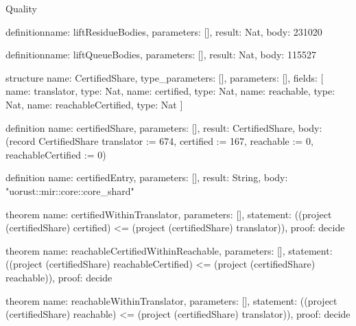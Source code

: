 \begin{lexlean}{Quality}
\begin{semanticmodule}
definition{name: liftResidueBodies, parameters: [], result: Nat, body: 231020}

definition{name: liftQueueBodies, parameters: [], result: Nat, body: 115527}

structure{
  name: CertifiedShare,
  type_parameters: [],
  parameters: [],
  fields: [
    {name: translator, type: Nat},
    {name: certified, type: Nat},
    {name: reachable, type: Nat},
    {name: reachableCertified, type: Nat}
  ]
}

definition{
  name: certifiedShare,
  parameters: [],
  result: CertifiedShare,
  body: (record CertifiedShare {translator := 674, certified := 167, reachable := 0, reachableCertified := 0})
}

definition{
  name: certifiedEntry,
  parameters: [],
  result: String,
  body: "uorust::mir::core::core_shard"
}

theorem{
  name: certifiedWithinTranslator,
  parameters: [],
  statement: ((project (certifiedShare) certified) <= (project (certifiedShare) translator)),
  proof: decide{}
}

theorem{
  name: reachableCertifiedWithinReachable,
  parameters: [],
  statement: ((project (certifiedShare) reachableCertified) <= (project (certifiedShare) reachable)),
  proof: decide{}
}

theorem{
  name: reachableWithinTranslator,
  parameters: [],
  statement: ((project (certifiedShare) reachable) <= (project (certifiedShare) translator)),
  proof: decide{}
}


\end{semanticmodule}
\end{lexlean}
